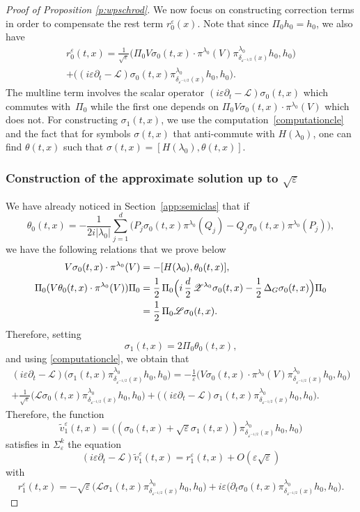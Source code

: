 \documentclass[JEP,XML,SOM,Unicode,published]{cedram}
\let\mathcal\mathscr
\theoremstyle{plain}
\theoremstyle{definition}
\let\eps\varepsilon
\begin{document}
\begin{proof}[Proof of Proposition \ref{p:wpschrod}]
We now focus on constructing correction terms in order to compensate the rest term $r_0^\eps(x)$. Note that since $\Pi_0 h_0=h_0$, we also have
\begin{multline*}
r_0^\eps(t,x)= \frac{1}{\sqrt\eps} \bigl(\Pi_0 V\sigma_0(t,x)\cdot \pi^{\lambda_0}(V)\pi^{\lambda_0}_{\delta_{\eps^{-1/2}}(x)}h_0,h_0\bigr)\\
+\bigl((i\eps\partial_t -\mathcal{L})\sigma_0(t,x)\pi^{\lambda_0}_{\delta_{\eps^{-1/2}}(x)}h_0,h_0\bigr).
\end{multline*}
The multline term involves the scalar operator $(i\eps\partial_t -\mathcal{L})\sigma_0(t,x)$ which commutes with~$\Pi_0$ while the first one depends on $\Pi_0 V\sigma_0(t,x)\cdot \pi^{\lambda_0}(V)$ which does not. For constructing $\sigma_1(t,x)$, we use the computation~\eqref{computationcle} and
the fact that for symbols $\sigma(t,x)$ that anti-commute with $H(\lambda_0)$, one can find $\theta(t,x)$ such that
$\sigma(t,x)= [H(\lambda_0),\theta(t,x)]$.

\subsubsection*{Construction of the approximate solution up to $\sqrt\eps$}
We have already noticed in Section~\ref{app:semiclas} that if
\[
\theta_0(t,x)= -\frac 1 {2i|\lambda_0|} \sum_{j=1}^{d}\bigl(P_j \sigma_0(t,x) \pi^{\lambda_0}(Q_j) - Q_j\sigma_0(t,x) \pi^{\lambda_0}(P_j)\bigr),
\]
we have the following relations that we prove below
\begin{align}\label{relation1}
V \sigma_0(t,x)\cdot \pi^{\lambda_0}(V) & =- [H(\lambda_0), \theta_0(t,x)],\\
\label{relation2}
\Pi_0 (V \theta_0(t,x)\cdot\pi^{\lambda_0}(V)) \Pi_0 &= \frac12\, \Pi_0 \Bigl(i\,\frac{d}{2}\, \mathcal Z ^{\lambda_0} \sigma_0(t,x) -\frac 12\,\Delta_G \sigma_0(t,x) \Bigr)\Pi_0\\
&= \frac 12\, \Pi_0 \mathcal{L}\sigma_0(t,x).\notag
\end{align}
Therefore, setting
\[
\sigma_1(t,x)= 2 \Pi_0 \theta_0(t,x),
\]
and using \eqref{computationcle}, we obtain that
\begin{multline*}
(i\eps\partial_t-\mathcal{L})\bigl(\sigma_1(t,x)\pi^{\lambda_0}_{\delta_{\eps^{-1/2}}(x)}h_0,h_0\bigr)=
-\frac{1}{\eps}\bigl(V \sigma_0(t,x)\cdot \pi^{\lambda_0}(V) \pi^{\lambda_0}_{\delta_{\eps^{-1/2}}(x)}h_0,h_0\bigr)\\
 +\frac{1}{\sqrt\eps}\bigl(\mathcal{L} \sigma_0(t,x) \pi^{\lambda_0}_{\delta_{\eps^{-1/2}}(x)}h_0,h_0\bigr)
+\bigl((i\eps\partial_t -\mathcal{L})\sigma_1(t,x)\pi^{\lambda_0}_{\delta_{\eps^{-1/2}}(x)}h_0,h_0\bigr).
\end{multline*}
Therefore, the function
\[
\widetilde v^\eps_1(t,x)= \bigl((\sigma_0(t,x) +\sqrt\eps \sigma_1(t,x))\pi^{\lambda_0}_{\delta_{\eps^{-1/2}}(x)}h_0,h_0\bigr)
\]
satisfies in $\Sigma^k_\eps$ the equation
\[
(i\eps\partial_t-\mathcal{L})\widetilde v^\eps_1(t,x)= r^\eps_1(t,x)+O(\eps\sqrt\eps)
\]
with
\[
r^\eps_1(t,x) = -\sqrt\eps
\bigl(\mathcal{L}\sigma_1(t,x)\pi^{\lambda_0}_{\delta_{\eps^{-1/2}}(x)}h_0,h_0\bigr)
+ i\eps \bigl(\partial_t \sigma_0 (t,x)\pi^{\lambda_0}_{\delta_{\eps^{-1/2}}(x)}h_0,h_0\bigr).
\]


\end{proof}
\end{document}
